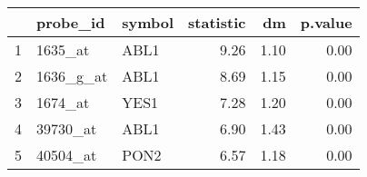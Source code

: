 \begin{table}[ht]
\centering
\begin{tabular}{rllrrr}
  \hline
 & probe\_id & symbol & statistic & dm & p.value \\ 
  \hline
1 & 1635\_at & ABL1 & 9.26 & 1.10 & 0.00 \\ 
  2 & 1636\_g\_at & ABL1 & 8.69 & 1.15 & 0.00 \\ 
  3 & 1674\_at & YES1 & 7.28 & 1.20 & 0.00 \\ 
  4 & 39730\_at & ABL1 & 6.90 & 1.43 & 0.00 \\ 
  5 & 40504\_at & PON2 & 6.57 & 1.18 & 0.00 \\ 
   \hline
\end{tabular}
\end{table}
